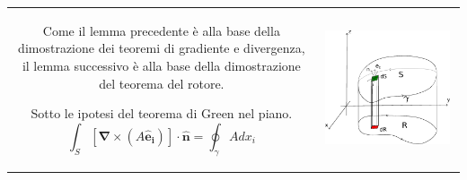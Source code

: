 %
\noindent 
\begin{tabular}{cc}
\begin{minipage}{0.6\textwidth}
 Come il lemma precedente è alla base della dimostrazione dei teoremi di gradiente e divergenza,
 il lemma successivo è alla base della dimostrazione del teorema del rotore.
\begin{lemma} \label{lemma:stokes:2} Sotto le ipotesi del teorema di Green nel piano.
\begin{equation}
  \int_S [\bm{\nabla} \times (A \bm{\hat{e}_i})] \cdot \bm{\hat{n}} = \oint_{\gamma} A dx_i
\end{equation}
\end{lemma}
\end{minipage}
&
\begin{minipage}{0.4\textwidth}
\begin{center}
  \includegraphics[width=0.95\textwidth]{./fig/Rot}
\end{center}
\end{minipage}
\end{tabular}
%
